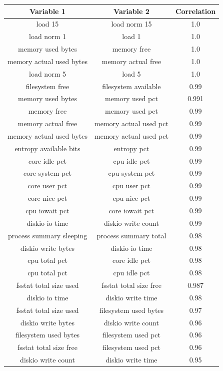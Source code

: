 \documentclass{iosart2c}
\begin{document}
\begin{table}[h!]
\begin{tabular}{ccc}
\hline
Variable 1 & Variable 2 & Correlation \\ \hline
load 15 & load norm 15 & 1.0\\ 
load norm 1 & load 1 & 1.0\\ 
memory used bytes & memory free & 1.0\\ 
memory actual used bytes & memory actual free & 1.0\\ 
load norm 5 & load 5 & 1.0\\ 
filesystem free & filesystem available & 0.99\\ 
memory used bytes & memory used pct & 0.991\\ 
memory free & memory used pct & 0.99\\ 
memory actual free & memory actual used pct & 0.99\\ 
memory actual used bytes & memory actual used pct & 0.99\\ 
entropy available bits & entropy pct & 0.99\\ 
core idle pct & cpu idle pct & 0.99\\ 
core system pct & cpu system pct & 0.99\\ 
core user pct & cpu user pct & 0.99\\ 
core nice pct & cpu nice pct & 0.99\\ 
cpu iowait pct & core iowait pct & 0.99\\ 
diskio io time & diskio write count & 0.99\\ 
process summary sleeping & process summary total & 0.98\\ 
diskio write bytes & diskio io time & 0.98\\ 
cpu total pct & core idle pct & 0.98\\ 
cpu total pct & cpu idle pct & 0.98\\ 
fsstat total size used & fsstat total size free & 0.987\\ 
diskio io time & diskio write time & 0.98\\ 
fsstat total size used & filesystem used bytes & 0.97\\ 
diskio write bytes & diskio write count & 0.96\\ 
filesystem used bytes & filesystem used pct & 0.96\\ 
fsstat total size free & filesystem used pct & 0.96\\ 
diskio write count & diskio write time & 0.95\\ 

\end{tabular}
\end{table}
\end{document}
